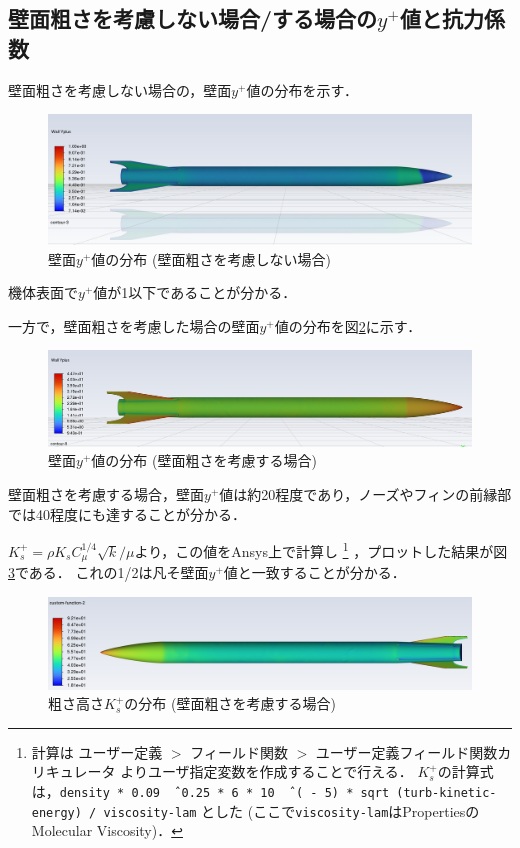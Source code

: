 \documentclass[uplatex,dvipdfmx,a4j,12pt]{jsarticle}
\begin{document}
\subsection{壁面粗さを考慮しない場合/する場合の$y^+$値と抗力係数}
壁面粗さを考慮しない場合の，壁面$y^+$値の分布を示す．
\begin{figure}[H]
  \centering
  \includegraphics[width=\linewidth]{wall_function/img/4_1_yplus_wo_rough.png}
  \caption{壁面$y^+$値の分布 (壁面粗さを考慮しない場合)}
  \label{fig:yplus_no_rough}
\end{figure}
機体表面で$y^+$値が1以下であることが分かる．

一方で，壁面粗さを考慮した場合の壁面$y^+$値の分布を図\ref{fig:yplus_rough}に示す．
\begin{figure}[H]
  \centering
  \includegraphics[width=\linewidth]{wall_function/img/4_1_yplus_w_rough.png}
  \caption{壁面$y^+$値の分布 (壁面粗さを考慮する場合)}
  \label{fig:yplus_rough}
\end{figure}
壁面粗さを考慮する場合，壁面$y^+$値は約20程度であり，ノーズやフィンの前縁部では40程度にも達することが分かる．

$K_s^+ = \rho K_s C_\mu^{1/4}\sqrt{k} / \mu$より，この値をAnsys上で計算し
\footnote{
計算は ユーザー定義 $>$ フィールド関数 $>$ ユーザー定義フィールド関数カリキュレータ よりユーザ指定変数を作成することで行える．
$K_s^+$の計算式は，\texttt{density * 0.09 \^\, 0.25 * 6 * 10 \^\, ( - 5) * sqrt (turb-kinetic-energy) / viscosity-lam}
とした (ここで\texttt{viscosity-lam}はPropertiesのMolecular Viscosity)．
}
，プロットした結果が図\ref{fig:K_s}である．
これの1/2は凡そ壁面$y^+$値と一致することが分かる．
\begin{figure}[H]
  \centering
  \includegraphics[width=\linewidth]{wall_function/img/4_1_Ksplus.png}
  \caption{粗さ高さ$K_s^+$の分布 (壁面粗さを考慮する場合)}
  \label{fig:K_s} 
\end{figure}
\end{document}
